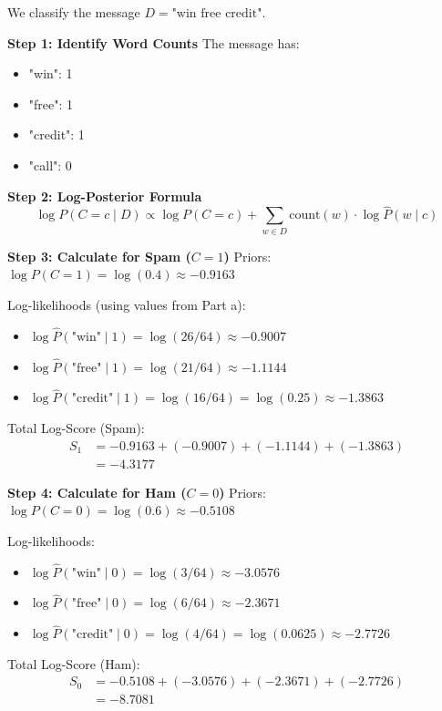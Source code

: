 \documentclass[12pt]{article}
\begin{document}
\begin{solution}
We classify the message $D = \text{"win free credit"}$.

\textbf{Step 1: Identify Word Counts}
The message has:
\begin{itemize}
    \item "win": 1
    \item "free": 1
    \item "credit": 1
    \item "call": 0
\end{itemize}

\textbf{Step 2: Log-Posterior Formula}
\[
\log P(C=c \mid D) \propto \log P(C=c) + \sum_{w \in D} \text{count}(w) \cdot \log \hat{P}(w \mid c)
\]

\textbf{Step 3: Calculate for Spam ($C=1$)}
Priors: $\log P(C=1) = \log(0.4) \approx -0.9163$

Log-likelihoods (using values from Part a):
\begin{itemize}
    \item $\log \hat{P}(\text{"win"} \mid 1) = \log(26/64) \approx -0.9007$
    \item $\log \hat{P}(\text{"free"} \mid 1) = \log(21/64) \approx -1.1144$
    \item $\log \hat{P}(\text{"credit"} \mid 1) = \log(16/64) = \log(0.25) \approx -1.3863$
\end{itemize}

Total Log-Score (Spam):
\begin{align*}
S_1 &= -0.9163 + (-0.9007) + (-1.1144) + (-1.3863) \\
&= -4.3177
\end{align*}

\textbf{Step 4: Calculate for Ham ($C=0$)}
Priors: $\log P(C=0) = \log(0.6) \approx -0.5108$

Log-likelihoods:
\begin{itemize}
    \item $\log \hat{P}(\text{"win"} \mid 0) = \log(3/64) \approx -3.0576$
    \item $\log \hat{P}(\text{"free"} \mid 0) = \log(6/64) \approx -2.3671$
    \item $\log \hat{P}(\text{"credit"} \mid 0) = \log(4/64) = \log(0.0625) \approx -2.7726$
\end{itemize}

Total Log-Score (Ham):
\begin{align*}
S_0 &= -0.5108 + (-3.0576) + (-2.3671) + (-2.7726) \\
&= -8.7081
\end{align*}


\end{solution}
\end{document}
